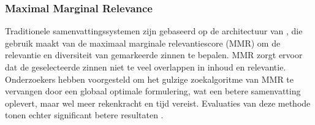 \subsubsection{Maximal Marginal Relevance}

Traditionele samenvattingssystemen zijn gebaseerd op de architectuur van \textcite{Carbonell1998}, die gebruik maakt van de maximaal marginale relevantiescore (MMR) om de relevantie en diversiteit van gemarkeerde zinnen te bepalen. MMR zorgt ervoor dat de geselecteerde zinnen niet te veel overlappen in inhoud en relevantie. Onderzoekers hebben voorgesteld om het gulzige zoekalgoritme van MMR te vervangen door een globaal optimale formulering, wat een betere samenvatting oplevert, maar wel meer rekenkracht en tijd vereist. Evaluaties van deze methode tonen echter significant betere resultaten \textcite{McDonald2007, Lin2010}.



